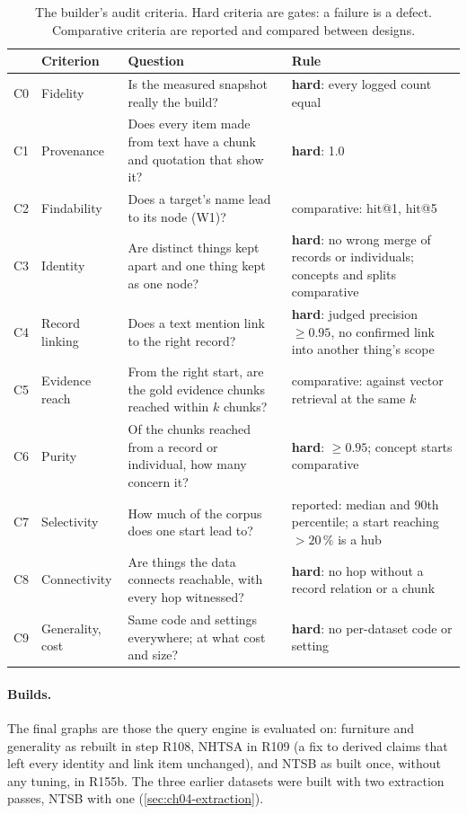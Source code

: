 \begin{table}[htbp]
\centering
\caption{The builder's audit criteria. Hard criteria are gates: a failure is a defect. Comparative criteria are
reported and compared between designs.}
\label{tab:criteria}
\scriptsize
\renewcommand{\arraystretch}{1.25}
\begin{tabularx}{\linewidth}{@{}l>{\raggedright}p{2.2cm}>{\raggedright}X>{\raggedright\arraybackslash}p{3.4cm}@{}}
\toprule
& Criterion & Question & Rule \\
\midrule
C0 & Fidelity & Is the measured snapshot really the build? & \textbf{hard}: every logged count equal \\
C1 & Provenance & Does every item made from text have a chunk and quotation that show it? & \textbf{hard}: 1.0 \\
C2 & Findability & Does a target's name lead to its node (W1)? & comparative: hit@1, hit@5 \\
C3 & Identity & Are distinct things kept apart and one thing kept as one node? & \textbf{hard}: no wrong merge of records or individuals; concepts and splits comparative \\
C4 & Record linking & Does a text mention link to the right record? & \textbf{hard}: judged precision $\geq 0.95$, no confirmed link into another thing's scope \\
C5 & Evidence reach & From the right start, are the gold evidence chunks reached within $k$ chunks? & comparative: against vector retrieval at the same $k$ \\
C6 & Purity & Of the chunks reached from a record or individual, how many concern it? & \textbf{hard}: $\geq 0.95$; concept starts comparative \\
C7 & Selectivity & How much of the corpus does one start lead to? & reported: median and 90th percentile; a start reaching $>20\,\%$ is a hub \\
C8 & Connectivity & Are things the data connects reachable, with every hop witnessed? & \textbf{hard}: no hop without a record relation or a chunk \\
C9 & Generality, cost & Same code and settings everywhere; at what cost and size? & \textbf{hard}: no per-dataset code or setting \\
\bottomrule
\end{tabularx}
\end{table}

\paragraph{Builds.} The final graphs are those the query engine is evaluated on: furniture and generality as
rebuilt in step R108, NHTSA in R109 (a fix to derived claims that left every identity and link item unchanged),
and NTSB as built once, without any tuning, in R155b. The three earlier datasets were built with two extraction
passes, NTSB with one (\cref{sec:ch04-extraction}).


